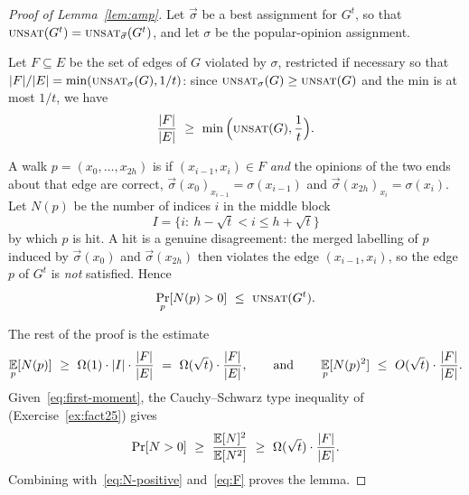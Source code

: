 \begin{proof}[Proof of Lemma~\ref{lem:amp}]
Let $\vec\sigma$ be a best assignment for $G^t$, so that $\textsc{unsat}(G^t)=\textsc{unsat}_{\vec\sigma}(G^t)$, and let $\sigma$ be the popular-opinion assignment.

Let $F\subseteq E$ be the set of edges of $G$ violated by $\sigma$, restricted if necessary so that $|F|/|E|=\min(\textsc{unsat}_\sigma(G),1/t)$:  since $\textsc{unsat}_\sigma(G)\ge\textsc{unsat}(G)$ and the min is at most $1/t$, we have
\begin{equation}\label{eq:F}
  \frac{|F|}{|E|}\ \ge\ \min\Big(\textsc{unsat}(G),\frac1t\Big).
\end{equation}

A walk $p=(x_0,\dots,x_{2h})$ is  if $(x_{i-1},x_i)\in F$ \emph{and} the opinions of the two ends about that edge are correct, \ie $\vec\sigma(x_0)_{x_{i-1}}=\sigma(x_{i-1})$ and $\vec\sigma(x_{2h})_{x_i}=\sigma(x_i)$.
Let $N(p)$ be the number of indices $i$ in the middle block
\[
  I=\{i:\ h-\sqrt t<i\le h+\sqrt t\}
\]
by which $p$ is hit.  A hit is a genuine disagreement: the merged labelling of $p$ induced by $\vec\sigma(x_0)$ and $\vec\sigma(x_{2h})$ then violates the edge $(x_{i-1},x_i)$, so the edge $p$ of $G^t$ is \emph{not} satisfied.
Hence
\begin{equation}\label{eq:N-positive}
  \Pr_p[N(p)>0]\ \le\ \textsc{unsat}(G^t).
\end{equation}

The rest of the proof is the estimate
\begin{equation}\label{eq:first-moment}
  \E_p[N(p)]\ \ge\ \Omega(1)\cdot|I|\cdot\frac{|F|}{|E|}\ =\ \Omega(\sqrt t)\cdot\frac{|F|}{|E|},
  \qquad\text{and}\qquad
  \E_p[N(p)^2]\ \le\ O(\sqrt t)\cdot\frac{|F|}{|E|}.
\end{equation}
Given~\eqref{eq:first-moment}, the Cauchy--Schwarz type inequality of \citet{Dinur07} (Exercise~\ref{ex:fact25}) gives
\[
  \Pr[N>0]\ \ge\ \frac{\E[N]^2}{\E[N^2]}\ \ge\ \Omega(\sqrt t)\cdot\frac{|F|}{|E|}.
\]
Combining with~\eqref{eq:N-positive} and~\eqref{eq:F} proves the lemma.


\end{proof}
